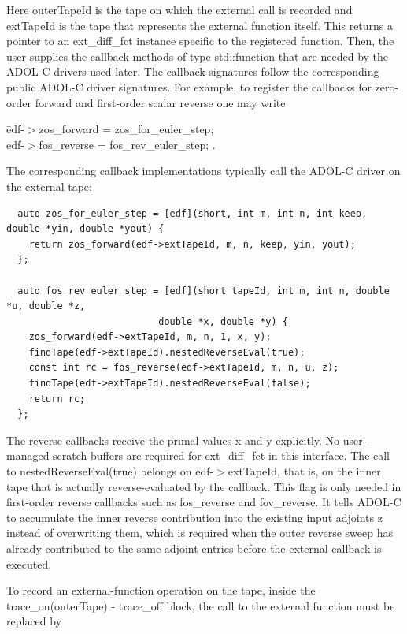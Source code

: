 \documentclass[11pt,twoside]{article}
\begin{document}
\noindent
Here {\sf outerTapeId} is the tape on which the external call is recorded and
{\sf extTapeId} is the tape that represents the external function itself.
This returns a pointer to an {\sf ext\_diff\_fct} instance specific to the
registered function. Then, the user supplies the callback methods of type {\sf std::function} that are
needed by the ADOL-C drivers used later. The callback signatures follow the
corresponding public ADOL-C driver signatures. For example, to register the callbacks for zero-order
forward and first-order scalar reverse one may write
\begin{tabbing}
\hspace*{2cm}\= {\sf edf-$>$zos\_forward = zos\_for\_euler\_step;}\\
             \> {\sf edf-$>$fos\_reverse = fos\_rev\_euler\_step;} .
\end{tabbing}
\noindent
The corresponding callback implementations typically call the ADOL-C driver on
the external tape:
\begin{verbatim}
  auto zos_for_euler_step = [edf](short, int m, int n, int keep, double *yin, double *yout) {
    return zos_forward(edf->extTapeId, m, n, keep, yin, yout);
  };

  auto fos_rev_euler_step = [edf](short tapeId, int m, int n, double *u, double *z,
                           double *x, double *y) {
    zos_forward(edf->extTapeId, m, n, 1, x, y);
    findTape(edf->extTapeId).nestedReverseEval(true);
    const int rc = fos_reverse(edf->extTapeId, m, n, u, z);
    findTape(edf->extTapeId).nestedReverseEval(false);
    return rc;
  };
\end{verbatim}

\noindent
The reverse callbacks receive the primal values {\sf x} and {\sf y} explicitly.
No user-managed scratch buffers are required for {\sf ext\_diff\_fct} in this
interface.  The call to {\sf nestedReverseEval(true)} belongs on
{\sf edf-$>$extTapeId}, that is, on the inner tape that is actually
reverse-evaluated by the callback. This flag is only needed in first-order
reverse callbacks such as {\sf fos\_reverse} and {\sf fov\_reverse}. It tells
ADOL-C to accumulate the inner reverse contribution into the existing input
adjoints {\sf z} instead of overwriting them, which is required when the outer
reverse sweep has already contributed to the same adjoint entries before the
external callback is executed.

\medskip
To record an external-function operation on the tape, inside the {\sf trace\_on(outerTape)} - {\sf trace\_off} block, the call to the external function must be replaced by
\smallskip
\end{document}
